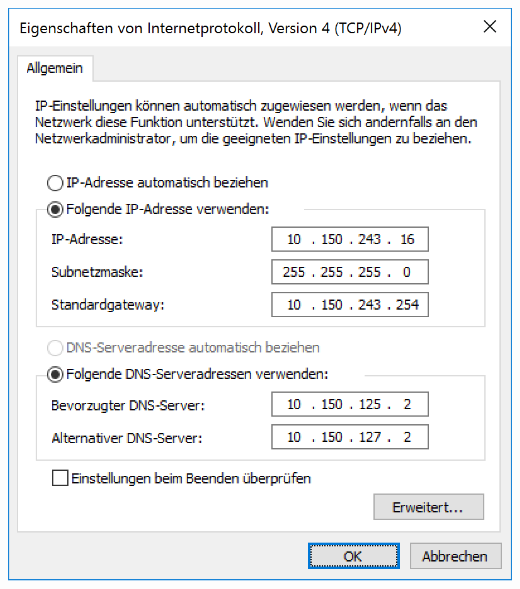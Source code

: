 \documentclass[a4paper,12pt]{scrartcl}
\begin{document}
\begin{minipage}{0.4\textwidth}
	\includegraphics[width=\textwidth]{Bilder/IP_Windows}
\end{minipage}%
\end{document}
